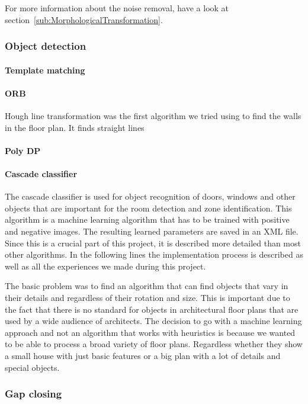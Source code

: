 For more information about the noise removal, have a look at section~\ref{sub:MorphologicalTransformation}.

\subsubsection{Object detection}
\paragraph{Template matching}
\paragraph{ORB}

Hough line transformation was the first algorithm we tried using to find the walls in the floor plan. It finds straight lines  

\paragraph{Poly DP}
\paragraph{Cascade classifier}
The cascade classifier is used for object recognition of doors, windows and other objects that are important for the room detection and zone identification. This algorithm is a machine learning algorithm that has to be trained with positive and negative images. The resulting learned parameters are saved in an XML file. Since this is a crucial part of this project, it is described more detailed than most other algorithms. In the following lines the implementation process is described as well as all the experiences we made during this project.

The basic problem was to find an algorithm that can find objects that vary in their details and regardless of their rotation and size. This is important due to the fact that there is no standard for objects in architectural floor plans that are used by a wide audience of architects. The decision to go with a machine learning approach and not an algorithm that works with heuristics is because we wanted to be able to process a broad variety of floor plans. Regardless whether they show a small house with just basic features or a big plan with a lot of details and special objects.

\subsubsection{Gap closing}
